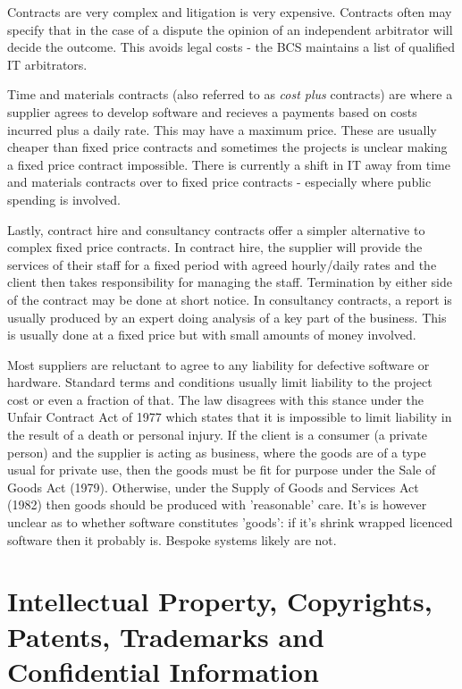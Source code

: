 \documentclass{article}
\begin{document}
	\par Contracts are very complex and litigation is very expensive. Contracts often may specify that in the case of a dispute the opinion of an independent arbitrator will decide the outcome. This avoids legal costs - the BCS maintains a list of qualified IT arbitrators.
	
	\par Time and materials contracts (also referred to as \textit{cost plus} contracts) are where a supplier agrees to develop software and recieves a payments based on costs incurred plus a daily rate. This may have a maximum price. These are usually cheaper than fixed price contracts and sometimes the projects is unclear making a fixed price contract impossible. There is currently a shift in IT away from time and materials contracts over to fixed price contracts - especially where public spending is involved.
	
	Lastly, contract hire and consultancy contracts offer a simpler alternative to complex fixed price contracts. In contract hire, the supplier will provide the services of their staff for a fixed period with agreed hourly/daily rates and the client then takes responsibility for managing the staff. Termination by either side of the contract may be done at short notice. In consultancy contracts, a report is usually produced by an expert doing analysis of a key part of the business. This is usually done at a fixed price but with small amounts of money involved.
	
	\par 
	Most suppliers are reluctant to agree to any liability for defective software or hardware. Standard terms and conditions usually limit liability to the project cost or even a fraction of that. The law disagrees with this stance under the Unfair Contract Act of 1977 which states that it is impossible to limit liability in the result of a death or personal injury. If the client is a consumer (a private person) and the supplier is acting as business, where the goods are of a type usual for private use, then the goods must be fit for purpose under the Sale of Goods Act (1979). Otherwise, under the Supply of Goods and Services Act (1982) then goods should be produced with 'reasonable' care. It's is however unclear as to whether software constitutes 'goods': if it's shrink wrapped licenced software then it probably is. Bespoke systems likely are not.
	
	\section{Intellectual Property, Copyrights, Patents, Trademarks and Confidential Information}
	
\end{document}
